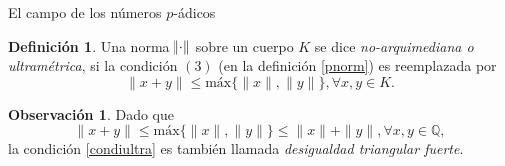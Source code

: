 \documentclass{beamer}
\theoremstyle{definition}
\numberwithin{equation}{section}
\newcommand{\marine}[1]{\textcolor{defColor}{#1}}
\newcommand{\redd}[1]{\textcolor{rkColor}{#1}}
\newtheorem{df}{\marine{Definición}}
\newtheorem{rr}{\redd{Observación}}
\newcommand{\tit}[1]{\textit{#1}}
\renewcommand{\leq}{\leqslant}
\newcommand{\maxx}[1]{\text{m\'ax} #1}
\begin{document}
\begin{frame}{El campo de los números $p$-ádicos}
\begin{df}
	Una norma $\norm{\cdot}$ sobre un cuerpo $K$ se dice \textit{no-arquimediana o ultramétrica}, si la condición $ (3)$  (en la definición \ref{pnorm})  es reemplazada por
	\begin{equation}\label{condiultra}
	\|x+y\| \le \maxx\{\|x\|, \|y\|\}, \forall x,y\in K.
	\end{equation} 
\end{df}
\begin{rr}
	Dado que
	$$\|x+y\| \le \maxx\{\|x\|, \|y\|\} \leq \|x\| + \|y\|, \forall x,y\in \mathbb{Q},$$ 
	la condición \ref{condiultra} es también llamada \tit{desigualdad triangular  fuerte}.
\end{rr}
\end{frame}
\end{document}

